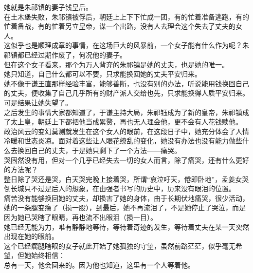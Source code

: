 \begin{multicols}{\theparacolNo}
她就是朱祁镇的妻子钱皇后。\\

在土木堡失败，朱祁镇被俘后，朝廷上上下下忙成一团，有的忙着准备逃跑，有的忙着备战，有的忙着另立皇帝，谋一个出路，没有人去理会这个失去了丈夫的女人。\\

这似乎也是顺理成章的事情，在这场巨大的风暴前，一个女子能有什么作为呢？朱祁镇都已经过期作废了，何况他的妻子。\\

但在这个女子看来，那个为万人背弃的朱祁镇是她的丈夫，也是她的唯一。\\

她只知道，自己什么都可以不要，只求能换回她的丈夫平安归来。\\

她不像于谦王直那样经验丰富，能够善断，也没有别的办法，听说能用钱换回自己的丈夫，便收集了自己几乎所有的财产派人交给也先，只求能换得人质平安归来。可是结果让她失望了。\\

之后发生的事情大家都知道了，于谦主持大局，朱祁钰成为了新的皇帝，朱祁镇成了太上皇，朝廷上下都把他当成累赘，再也无人理会他，更不会有人花钱赎他。\\

政治风云的变幻莫测就发生在这个女人的眼前，在这段日子中，她充分体会了人情冷暖和世态炎凉。面对着这些让人眼花缭乱的变化，她没有办法也没有能力做些什么去换回自己的丈夫，于是她只剩下了一个方法——痛哭。\\

哭固然没有用，但对一个几乎已经失去一切的女人而言，除了痛哭，还有什么更好的方法呢？\\

整日除了哭还是哭，白天哭完晚上接着哭，所谓“哀泣吁天，倦即卧地”，孟姜女哭倒长城只不过是后人的想象，在由强者书写的历史中，历来没有眼泪的位置。\\

痛苦没有能够换回她的丈夫，却损害了她的身体，由于长期伏地痛哭，很少活动，她的一条腿变瘸了（损一股），到最后，她不再流泪了，不是她停止了哭泣，而是因为她已哭瞎了眼睛，再也流不出眼泪（损一目）。\\

她已经无能为力，唯有静静地等待，等待着奇迹的发生，等待着丈夫在某一天突然出现在她的眼前。\\

这个已经瘸腿瞎眼的女子就此开始了她孤独的守望，虽然前路茫茫，似乎毫无希望，但她始终相信：\\

总有一天，他会回来的。因为他也知道，这里有一个人等着他。\\


\end{multicols}
